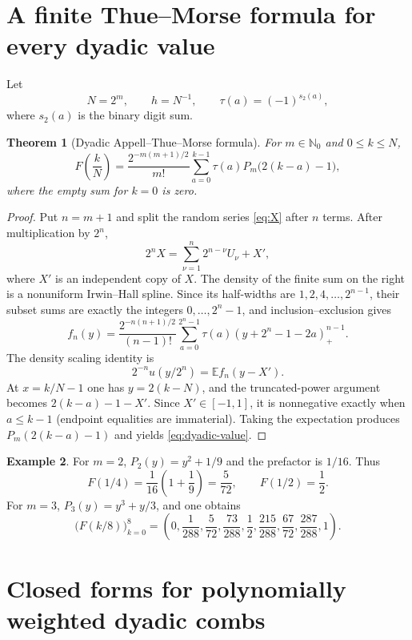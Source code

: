 \documentclass[11pt]{article}
\newtheorem{theorem}{Theorem}[section]
\theoremstyle{definition}
\newtheorem{example}[theorem]{Example}
\theoremstyle{remark}
\newcommand{\N}{\mathbb N}
\newcommand{\tm}{\tau}
\begin{document}
\section{A finite Thue--Morse formula for every dyadic value}

Let
\[
 N=2^m,\qquad h=N^{-1},\qquad
 \tm(a)=(-1)^{s_2(a)},
\]
where $s_2(a)$ is the binary digit sum.

\begin{theorem}[Dyadic Appell--Thue--Morse formula]\label{thm:dyadic-values}
For $m\in\N_0$ and $0\le k\le N$,
\begin{equation}\label{eq:dyadic-value}
 F\!\left(\frac{k}{N}\right)
 =\frac{2^{-m(m+1)/2}}{m!}
   \sum_{a=0}^{k-1}\tm(a)P_m\bigl(2(k-a)-1\bigr),
\end{equation}
where the empty sum for $k=0$ is zero.
\end{theorem}

\begin{proof}
Put $n=m+1$ and split the random series \eqref{eq:X} after $n$ terms.  After
multiplication by $2^n$,
\[
 2^nX=\sum_{\nu=1}^{n}2^{n-\nu}U_\nu+X',
\]
where $X'$ is an independent copy of $X$.  The density of the finite sum on the
right is a nonuniform Irwin--Hall spline.  Since its half-widths are
$1,2,4,\ldots,2^{n-1}$, their subset sums are exactly the integers
$0,\ldots,2^n-1$, and inclusion--exclusion gives
\[
 f_n(y)=\frac{2^{-n(n+1)/2}}{(n-1)!}
 \sum_{a=0}^{2^n-1}\tm(a)
 (y+2^n-1-2a)_+^{n-1}.
\]
The density scaling identity is
\[
 2^{-n}u(y/2^n)=\mathbb E f_n(y-X').
\]
At $x=k/N-1$ one has $y=2(k-N)$, and the truncated-power argument becomes
$2(k-a)-1-X'$.  Since $X'\in[-1,1]$, it is nonnegative exactly when
$a\le k-1$ (endpoint equalities are immaterial).  Taking the expectation
produces $P_m(2(k-a)-1)$ and yields \eqref{eq:dyadic-value}.
\end{proof}

\begin{example}
For $m=2$, $P_2(y)=y^2+1/9$ and the prefactor is $1/16$.  Thus
\[
 F(1/4)=\frac1{16}\left(1+\frac19\right)=\frac5{72},
 \qquad F(1/2)=\frac12.
\]
For $m=3$, $P_3(y)=y^3+y/3$, and one obtains
\[
 \bigl(F(k/8)\bigr)_{k=0}^8
 =\left(0,\frac1{288},\frac5{72},\frac{73}{288},\frac12,
 \frac{215}{288},\frac{67}{72},\frac{287}{288},1\right).
\]
\end{example}

\section{Closed forms for polynomially weighted dyadic combs}
\end{document}
